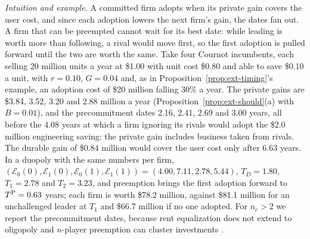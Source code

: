 \noindent\emph{Intuition and example.} A committed firm adopts when its private gain covers the user cost, and since each adoption lowers the next firm's gain, the dates fan out. A firm that can be preempted cannot wait for its best date: while leading is worth more than following, a rival would move first, so the first adoption is pulled forward until the two are worth the same. Take four Cournot incumbents, each selling 20 million units a year at \$1.00 with unit cost \$0.80 and able to save \$0.10 a unit, with $r=0.10$, $G=0.04$ and, as in Proposition~\ref{prop:ext-timing}'s example, an adoption cost of \$20 million falling 30\% a year. The private gains are \$3.84, 3.52, 3.20 and 2.88 million a year (Proposition~\ref{prop:ext-should}(a) with $B=0.01$), and the precommitment dates 2.16, 2.41, 2.69 and 3.00 years, all before the 4.08 years at which a firm ignoring its rivals would adopt the \$2.0 million engineering saving: the private gain includes business taken from rivals. The durable gain of \$0.84 million would cover the user cost only after 6.63 years. In a duopoly with the same numbers per firm, $(\mathcal E_0(0),\mathcal E_1(0),\mathcal E_0(1),\mathcal E_1(1))=(4.00,7.11,2.78,5.44)$, $T_D=1.80$, $T_1=2.78$ and $T_2=3.23$, and preemption brings the first adoption forward to $T^{\rm P}=0.63$ years; each firm is worth \$78.2 million, against \$81.1 million for an unchallenged leader at $T_1$ and \$66.7 million if no one adopted. For $n_c>2$ we report the precommitment dates, because rent equalization does not extend to oligopoly \citep{fudenberg1985preemption} and $n$-player preemption can cluster investments \citep{argenziano2014clustering}.

